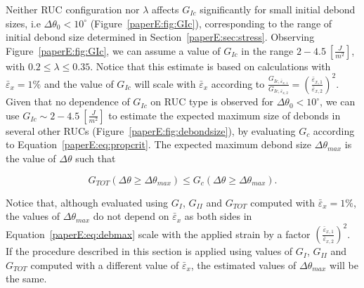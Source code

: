 Neither RUC configuration nor $\lambda$ affects $G_{Ic}$ significantly for small initial debond sizes, i.e $\Delta\theta_{0}<10^{\circ}$ (Figure~\ref{paperE:fig:GIc}), corresponding to the range of initial debond size determined in Section~\ref{paperE:sec:stress}. Observing Figure~\ref{paperE:fig:GIc}, we can assume a value of $G_{Ic}$ in the range $2-4.5\ \left[\frac{J}{m^{2}}\right]$, with $0.2\leq\lambda\leq0.35$. Notice that this estimate is based on calculations with $\bar{\varepsilon}_{x}=1\%$ and the value of $G_{Ic}$ will scale with $\bar{\varepsilon}_{x}$ according to $\frac{G_{Ic,\bar{\varepsilon}_{x,1}}}{G_{Ic,\bar{\varepsilon}_{x,2}}}=\left(\frac{\bar{\varepsilon}_{x,1}}{\bar{\varepsilon}_{x,2}}\right)^{2}$. Given that no dependence of $G_{Ic}$ on RUC type is observed for $\Delta\theta_{0}<10^{\circ}$, we can use $G_{Ic}\sim2-4.5\ \left[\frac{J}{m^{2}}\right]$ to estimate the expected maximum size of debonds in several other RUCs (Figure~\ref{paperE:fig:debondsize}), by evaluating $G_{c}$ according to Equation~\ref{paperE:eq:propcrit}. The expected maximum debond size $\Delta\theta_{max}$ is the value of $\Delta\theta$ such that

\begin{equation}\label{paperE:eq:debmax}
G_{TOT}\left(\Delta\theta\geq\Delta\theta_{max}\right)\leq G_{c}\left(\Delta\theta\geq\Delta\theta_{max}\right).
\end{equation}

Notice that, although evaluated using $G_{I}$, $G_{II}$ and $G_{TOT}$ computed with $\bar{\varepsilon}_{x}=1\%$, the values of $\Delta\theta_{max}$ do not depend on $\bar{\varepsilon}_{x}$ as both sides in Equation~\ref{paperE:eq:debmax} scale with the applied strain by a factor $\left(\frac{\bar{\varepsilon}_{x,1}}{\bar{\varepsilon}_{x,2}}\right)^{2}$. If the procedure described in this section is applied using values of $G_{I}$, $G_{II}$ and $G_{TOT}$ computed with a different value of $\bar{\varepsilon}_{x}$, the estimated values of $\Delta\theta_{max}$ will be the same.

